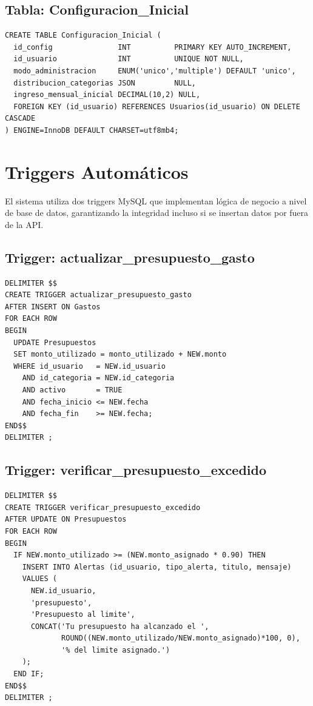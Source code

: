 \subsection{Tabla: Configuracion\_Inicial}

\begin{lstlisting}[style=sql, caption={DDL de Configuracion\_Inicial}]
CREATE TABLE Configuracion_Inicial (
  id_config               INT          PRIMARY KEY AUTO_INCREMENT,
  id_usuario              INT          UNIQUE NOT NULL,
  modo_administracion     ENUM('unico','multiple') DEFAULT 'unico',
  distribucion_categorias JSON         NULL,
  ingreso_mensual_inicial DECIMAL(10,2) NULL,
  FOREIGN KEY (id_usuario) REFERENCES Usuarios(id_usuario) ON DELETE CASCADE
) ENGINE=InnoDB DEFAULT CHARSET=utf8mb4;
\end{lstlisting}

\section{Triggers Automáticos}

El sistema utiliza dos triggers MySQL que implementan lógica de negocio a nivel de base de datos, garantizando la integridad incluso si se insertan datos por fuera de la API.

\subsection{Trigger: actualizar\_presupuesto\_gasto}

\begin{lstlisting}[style=sql, caption={Trigger de actualización de presupuesto al registrar gasto}, label={lst:trigger1}]
DELIMITER $$
CREATE TRIGGER actualizar_presupuesto_gasto
AFTER INSERT ON Gastos
FOR EACH ROW
BEGIN
  UPDATE Presupuestos
  SET monto_utilizado = monto_utilizado + NEW.monto
  WHERE id_usuario   = NEW.id_usuario
    AND id_categoria = NEW.id_categoria
    AND activo       = TRUE
    AND fecha_inicio <= NEW.fecha
    AND fecha_fin    >= NEW.fecha;
END$$
DELIMITER ;
\end{lstlisting}

\subsection{Trigger: verificar\_presupuesto\_excedido}

\begin{lstlisting}[style=sql, caption={Trigger de alerta cuando el presupuesto alcanza el 90\%}, label={lst:trigger2}]
DELIMITER $$
CREATE TRIGGER verificar_presupuesto_excedido
AFTER UPDATE ON Presupuestos
FOR EACH ROW
BEGIN
  IF NEW.monto_utilizado >= (NEW.monto_asignado * 0.90) THEN
    INSERT INTO Alertas (id_usuario, tipo_alerta, titulo, mensaje)
    VALUES (
      NEW.id_usuario,
      'presupuesto',
      'Presupuesto al limite',
      CONCAT('Tu presupuesto ha alcanzado el ',
             ROUND((NEW.monto_utilizado/NEW.monto_asignado)*100, 0),
             '% del limite asignado.')
    );
  END IF;
END$$
DELIMITER ;
\end{lstlisting}

